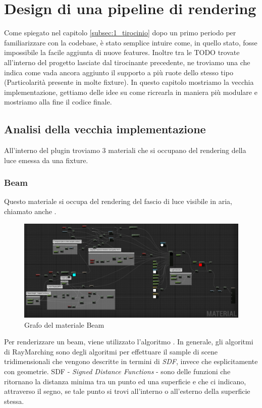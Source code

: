 \documentclass[main.tex]{subfiles}
\begin{document}
\sloppy


\vspace{1.0cm}

\section{Design di una pipeline di rendering}\label{sec:RenderingPipeline}
Come spiegato nel capitolo \ref{subsec:1_tirocinio} dopo un primo periodo per familiarizzare con la codebase, è stato semplice intuire come, in quello stato, fosse impossibile la facile aggiunta di nuove features. Inoltre tra le TODO trovate all'interno del progetto lasciate dal tirocinante precedente, ne troviamo una che indica come vada ancora aggiunto il supporto a più ruote dello stesso tipo (Particolarità presente in molte fixture). In questo capitolo mostriamo la vecchia implementazione, gettiamo delle idee su come ricrearla in maniera più modulare e mostriamo alla fine il codice finale.

\subsection{Analisi della vecchia implementazione}\label{subsec:2_oldImplementation}
All'interno del plugin troviamo 3 materiali che si occupano del rendering della luce emessa da una fixture.
\subsubsection{Beam}\label{subsec:2_1_beam}
Questo materiale si occupa del rendering del fascio di luce visibile in aria, chiamato anche .
\begin{figure}[H]
    \centering
    \includegraphics[width=1\linewidth]{img/renderingPipeline/BeamMaterialFull.jpg}
    \caption{Grafo del materiale Beam}
    \label{fig:2_beamGraphFull}
\end{figure}
Per renderizzare un beam, viene utilizzato l'algoritmo . In generale, gli algoritmi di RayMarching \cite{RayMarching} sono degli algoritmi per effettuare il sample di scene tridimensionali che vengono descritte in termini di \textit{SDF}, invece che esplicitamente con geometrie. SDF - \textit{Signed Distance Functions} - sono delle funzioni che ritornano la distanza minima tra un punto ed una superficie e che ci indicano, attraverso il segno, se tale punto si trovi all'interno o all'esterno della superficie stessa.\newline
\end{document}
